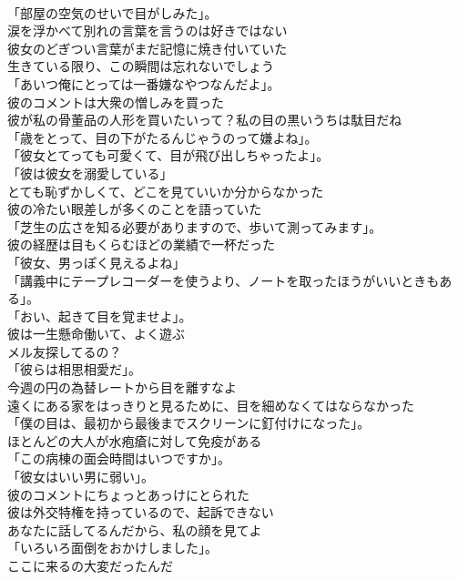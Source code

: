 \documentclass[8pt]{extreport}
\begin{document}
\begin{CJK}{UTF8}{min}
\\	「部屋の空気のせいで目がしみた」。	
\\	涙を浮かべて別れの言葉を言うのは好きではない	
\\	彼女のどぎつい言葉がまだ記憶に焼き付いていた	
\\	生きている限り、この瞬間は忘れないでしょう	
\\	「あいつ俺にとっては一番嫌なやつなんだよ」。	
\\	彼のコメントは大衆の憎しみを買った	
\\	彼が私の骨董品の人形を買いたいって？私の目の黒いうちは駄目だね	
\\	「歳をとって、目の下がたるんじゃうのって嫌よね」。	
\\	「彼女とてっても可愛くて、目が飛び出しちゃったよ」。	
\\	「彼は彼女を溺愛している」	
\\	とても恥ずかしくて、どこを見ていいか分からなかった	
\\	彼の冷たい眼差しが多くのことを語っていた	
\\	「芝生の広さを知る必要がありますので、歩いて測ってみます」。	
\\	彼の経歴は目もくらむほどの業績で一杯だった	
\\	「彼女、男っぽく見えるよね」	
\\	「講義中にテープレコーダーを使うより、ノートを取ったほうがいいときもある」。	
\\	「おい、起きて目を覚ませよ」。	
\\	彼は一生懸命働いて、よく遊ぶ	
\\	メル友探してるの？	
\\	「彼らは相思相愛だ」。	
\\	今週の円の為替レートから目を離すなよ	
\\	遠くにある家をはっきりと見るために、目を細めなくてはならなかった	
\\	「僕の目は、最初から最後までスクリーンに釘付けになった」。	
\\	ほとんどの大人が水疱瘡に対して免疫がある	
\\	「この病棟の面会時間はいつですか」。	
\\	「彼女はいい男に弱い」。	
\\	彼のコメントにちょっとあっけにとられた	
\\	彼は外交特権を持っているので、起訴できない	
\\	あなたに話してるんだから、私の顔を見てよ	
\\	「いろいろ面倒をおかけしました」。	
\\	ここに来るの大変だったんだ	

\end{CJK}
\end{document}
